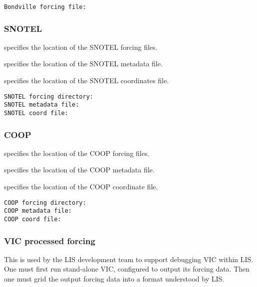  \begin{Verbatim}[frame=single]
Bondville forcing file:
 \end{Verbatim}



 
 \subsubsection{SNOTEL} \label{sssec:snotel}
 

 
  specifies the location of the
 SNOTEL forcing files.

  specifies the location of the SNOTEL
 metadata file.

  specifies the location of the SNOTEL
 coordinates file.
 

 \begin{Verbatim}[frame=single]
SNOTEL forcing directory:
SNOTEL metadata file:
SNOTEL coord file:
 \end{Verbatim}

 
 \subsubsection{COOP} \label{sssec:coop}
 

 
  specifies the location of the COOP
 forcing files.

  specifies the location of the COOP
 metadata file.

  specifies the location of the COOP
 coordinate file.
 

 \begin{Verbatim}[frame=single]
COOP forcing directory:
COOP metadata file:
COOP coord file:
 \end{Verbatim}

 
 \subsubsection{VIC processed forcing} \label{sssec:vicforcing}

 This is used by the LIS development team to support debugging VIC
 within LIS.  One must first run stand-alone VIC, configured to
 output its forcing data.  Then one must grid the output forcing
 data into a format understood by LIS.
 

